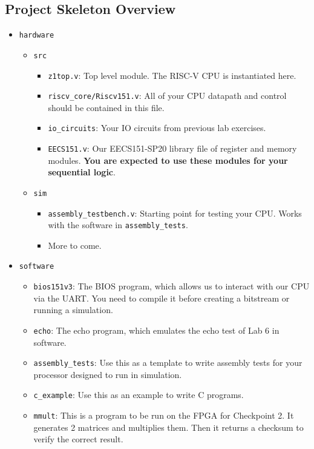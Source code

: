 \documentclass[11pt]{article}
\begin{document}
\subsection{Project Skeleton Overview}
\begin{itemize}
  \item \texttt{hardware}
    \begin{itemize}
      \item \texttt{src}
        \begin{itemize}
          \item \texttt{z1top.v}: Top level module. The RISC-V CPU is instantiated here.
          \item \texttt{riscv\_core/Riscv151.v}: All of your CPU datapath and control should be contained in this file.
          \item \texttt{io\_circuits}: Your IO circuits from previous lab exercises.
          \item \texttt{EECS151.v}: Our EECS151-SP20 library file of register and memory modules. \textbf{You are expected to use these modules for your sequential logic}.
        \end{itemize}
      \item \texttt{sim}
        \begin{itemize}
          \item \verb|assembly_testbench.v|: Starting point for testing your CPU. Works with the software in \texttt{assembly\_tests}.
          \item More to come.
        \end{itemize}
    \end{itemize}
  \item \texttt{software}
    \begin{itemize}
      \item \verb|bios151v3|: The BIOS program, which allows us to interact with our CPU via the UART. You need to compile it before creating a bitstream or running a simulation.
      \item \verb|echo|: The echo program, which emulates the echo test of Lab 6 in software.
      \item \verb|assembly_tests|: Use this as a template to write assembly tests for your processor designed to run in simulation.
      \item \verb|c_example|: Use this as an example to write C programs.
      \item \verb|mmult|: This is a program to be run on the FPGA for Checkpoint 2. It generates 2 matrices and multiplies them. Then it returns a checksum to verify the correct result.
    \end{itemize}
\end{itemize}
\end{document}

